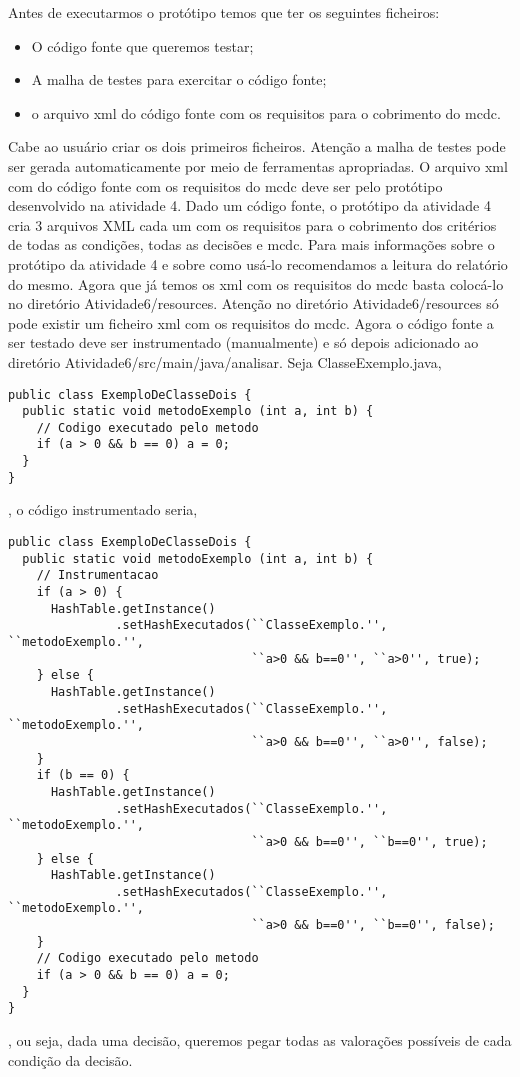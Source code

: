 \documentclass[a4paper,11pt]{article}
\begin{document}
\begin{itemize}
Antes de executarmos o protótipo temos que ter os seguintes ficheiros:
\begin{itemize}
\item O código fonte que queremos testar;
\item A malha de testes para exercitar o código fonte;
\item o arquivo xml do código fonte com os requisitos para o cobrimento do mcdc.
\end{itemize}
Cabe ao usuário criar os dois primeiros ficheiros. Atenção a malha de testes pode ser gerada automaticamente por 
meio de ferramentas apropriadas.
O arquivo xml com do código fonte com os requisitos do mcdc deve ser pelo protótipo desenvolvido na atividade 4.
Dado um código fonte, o protótipo da atividade 4 cria 3 arquivos XML cada um com os requisitos para o cobrimento 
dos critérios de todas as condições, todas as decisões e mcdc. Para mais informações sobre o protótipo da atividade 4
e sobre como usá-lo recomendamos a leitura do relatório do mesmo. Agora que já temos os xml com os requisitos do mcdc
basta colocá-lo no diretório Atividade6/resources. Atenção no diretório Atividade6/resources só pode existir um ficheiro
xml com os requisitos do mcdc.
Agora o código fonte a ser testado deve ser instrumentado (manualmente) e só depois adicionado ao diretório 
Atividade6/src/main/java/analisar. 
Seja ClasseExemplo.java,
\begin{lstlisting}
public class ExemploDeClasseDois {
  public static void metodoExemplo (int a, int b) {
    // Codigo executado pelo metodo
    if (a > 0 && b == 0) a = 0;
  }
}
\end{lstlisting}
, o código instrumentado seria,
\begin{lstlisting}
public class ExemploDeClasseDois {
  public static void metodoExemplo (int a, int b) {
    // Instrumentacao
    if (a > 0) {
      HashTable.getInstance()
               .setHashExecutados(``ClasseExemplo.'', ``metodoExemplo.'', 
                                  ``a>0 && b==0'', ``a>0'', true);
    } else {
      HashTable.getInstance()
               .setHashExecutados(``ClasseExemplo.'', ``metodoExemplo.'', 
                                  ``a>0 && b==0'', ``a>0'', false);
    }
    if (b == 0) {
      HashTable.getInstance()
               .setHashExecutados(``ClasseExemplo.'', ``metodoExemplo.'', 
                                  ``a>0 && b==0'', ``b==0'', true);
    } else {
      HashTable.getInstance()
               .setHashExecutados(``ClasseExemplo.'', ``metodoExemplo.'', 
                                  ``a>0 && b==0'', ``b==0'', false);
    }
    // Codigo executado pelo metodo
    if (a > 0 && b == 0) a = 0;    
  }
}
\end{lstlisting}
, ou seja, dada uma decisão, queremos pegar todas as valorações possíveis de cada condição da decisão.


\end{itemize}
\end{document}
